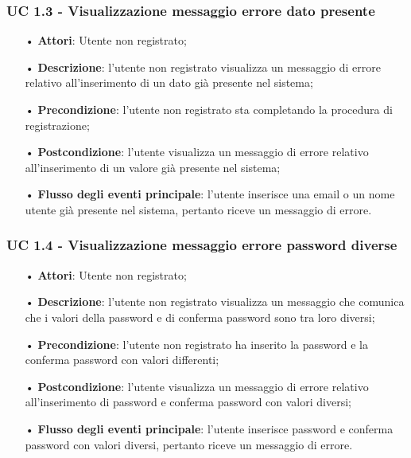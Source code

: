 \subsubsection{UC 1.3 - Visualizzazione messaggio errore dato presente}
\begin{itemize}
	\item[•]\textbf{Attori}: Utente non registrato;
	\item[•]\textbf{Descrizione}: l'utente non registrato visualizza un messaggio di errore relativo all'inserimento
	di un dato già presente nel sistema;
	\item[•]\textbf{Precondizione}: l'utente non registrato sta completando la procedura di registrazione;
	\item[•]\textbf{Postcondizione}: l'utente visualizza un messaggio di errore relativo all'inserimento di un valore già presente nel sistema;
	\item[•]\textbf{Flusso degli eventi principale}: l'utente inserisce una email o un nome utente già presente nel sistema, pertanto riceve un messaggio di errore.
\end{itemize}

\subsubsection{UC 1.4 - Visualizzazione messaggio errore password diverse}
\begin{itemize}
	\item[•]\textbf{Attori}: Utente non registrato;
	\item[•]\textbf{Descrizione}: l'utente non registrato visualizza un messaggio che comunica che i valori della password e di conferma password sono tra loro diversi;
	\item[•]\textbf{Precondizione}: l'utente non registrato ha inserito la password e la conferma password con valori differenti;
	\item[•]\textbf{Postcondizione}: l'utente visualizza un messaggio di errore relativo all'inserimento di password e conferma password con valori diversi;
	\item[•]\textbf{Flusso degli eventi principale}: l'utente inserisce password e conferma password con valori diversi, pertanto riceve un messaggio di errore.
\end{itemize}